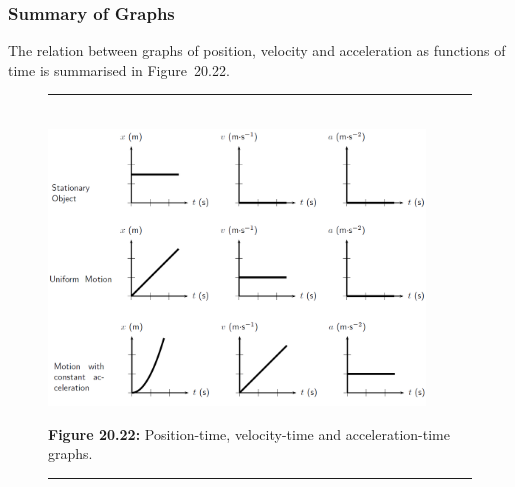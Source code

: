             \subsubsection{ Summary of Graphs}
            \nopagebreak
            \label{m38795*id73116}The relation between graphs of position, velocity and acceleration as functions of time is summarised in Figure~20.22.\par 
    \setcounter{subfigure}{0}
	\begin{figure}[H] %
    \begin{center}
    \rule[.1in]{\figurerulewidth}{.005in} \\
        \label{m38795*id73150!!!underscore!!!media}\label{m38795*id73150!!!underscore!!!printimage}\includegraphics[width=10cm]{col11305.imgs/m38795_PG10C2_029_1.png} %
      \vspace{2pt}
    \vspace{\rubberspace}\par \begin{cnxcaption}
	  \small \textbf{Figure 20.22: }Position-time, velocity-time and acceleration-time graphs.
	\end{cnxcaption}
    \vspace{.1in}
    \rule[.1in]{\figurerulewidth}{.005in} \\
    \end{center}
 \end{figure}       
\label{m38795*notfhsst!!!underscore!!!id3410}
